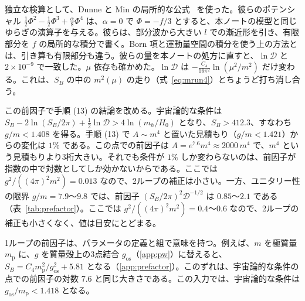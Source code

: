 \documentclass[a4paper,10pt]{ltjsarticle}
\begin{document}
独立な検算として、Dunne と Min の局所的な公式~\cite{dunnemin} を使った。彼らのポテンシャル $\frac12\Phi^2-\frac12\Phi^3+\frac\alpha8\Phi^4$ は、$\alpha=0$ で $\Phi=-f/3$ とすると、本ノートの模型と同じゆらぎの演算子を与える。彼らは、部分波から大きい $l$ での漸近形を引き、有限部分を $f$ の局所的な積分で書く。Born 項と運動量空間の積分を使う上の方法とは、引き算も有限部分も違う。彼らの量を本ノートの処方に直すと、$\ln\mathcal D$ と $2\times10^{-9}$ で一致した。$\mu$ 依存も確かめた。$\ln\mathcal D$ は $-\frac{C_4}{16\pi^2}\ln(\mu^2/m^2)$ だけ変わる。これは、$S_B$ の中の $m^2(\mu)$ の走り（式~\eqref{eq:mrun4}）とちょうど打ち消し合う。

この前因子で手順 (13) の結論を改める。宇宙論的な条件は $S_B-2\ln(S_B/2\pi)+\frac12\ln\mathcal D>4\ln(m_h/H_0)$ となり、$S_B>412.3$、すなわち $g/m<1.408$ を得る。手順 (13) で $A\sim m^4$ と置いた見積もり（$g/m<1.421$）からの変化は $1\%$ である。この点での前因子は $A=e^{7.6}m^4\approx2000\,m^4$ で、$m^4$ という見積もりより3桁大きい。それでも条件が $1\%$ しか変わらないのは、前因子が指数の中で対数としてしか効かないからである。ここでは $g^2/((4\pi)^2m^2)=0.013$ なので、2ループの補正は小さい。一方、ユニタリー性の限界 $g/m=7.9$〜$9.8$ では、前因子 $(S_B/2\pi)^2\mathcal D^{-1/2}$ は $0.85$〜$2.1$ である（表~\ref{tab:prefactor}）。ここでは $g^2/((4\pi)^2m^2)=0.4$〜$0.6$ なので、2ループの補正も小さくなく、値は目安にとどまる。

1ループの前因子は、パラメータの定義と組で意味を持つ。例えば、$m$ を極質量 $m_{\mathrm p}$ に、$g$ を質量殻上の3点結合 $g_{\mathrm{os}}$（\ref{app:pw}）に替えると、$S_B=C_4m_{\mathrm p}^2/g_{\mathrm{os}}^2+5.81$ となる（\ref{app:prefactor}）。このずれは、宇宙論的な条件の点での前因子の対数 $7.6$ と同じ大きさである。この入力では、宇宙論的な条件は $g_{\mathrm{os}}/m_{\mathrm p}<1.418$ となる。
\end{document}
